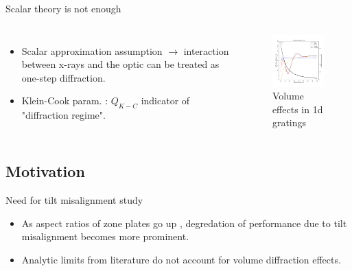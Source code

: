 \documentclass{beamer}
\begin{document}
\begin{frame}{Scalar theory is not enough}
	\begin{block}{}
		\begin{columns}[onlytextwidth,T]
			\column{\dimexpr\linewidth-30mm-10mm}
			\begin{itemize}
				\item Scalar approximation assumption $\rightarrow$ interaction between x-rays and the optic can be treated as one-step diffraction. 
				\item Klein-Cook param. : $Q_{K-C}$ indicator of 
				"diffraction regime"\footnotemark.
			\end{itemize}
			\column{30mm}
			\begin{figure}
				\hspace*{-0.75cm}\includegraphics[width=45mm]{grating}
				\caption{Volume effects in 1d gratings}
			\end{figure}
		\end{columns}
	\end{block}
\end{frame}

\subsection{Motivation}
\begin{frame}{Need for tilt misalignment study \footnotemark 	{}}
	\begin{itemize}
		\item As aspect ratios of zone plates go up\footnotemark {} , degredation of performance due to tilt misalignment becomes more prominent.
		\item Analytic limits\footnotemark 	{} from literature do not account for volume diffraction effects.
	\end{itemize}

\end{frame}
\end{document}

